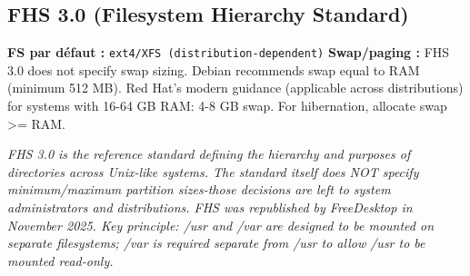 \documentclass[10pt,a4paper]{article}
\begin{document}
\subsection{FHS 3.0 (Filesystem Hierarchy Standard)}
\noindent\small \textbf{FS par d\'efaut :} \texttt{ext4/XFS (distribution-dependent)} \quad\textbullet\quad \textbf{Swap/paging :} FHS 3.0 does not specify swap sizing. Debian recommends swap equal to RAM (minimum 512 MB). Red Hat's modern guidance (applicable across distributions) for systems with 16-64 GB RAM: 4-8 GB swap. For hibernation, allocate swap >= RAM.\normalsize\par\smallskip
\noindent\small\textit{FHS 3.0 is the reference standard defining the hierarchy and purposes of directories across Unix-like systems. The standard itself does NOT specify minimum/maximum partition sizes-those decisions are left to system administrators and distributions. FHS was republished by FreeDesktop in November 2025. Key principle: /usr and /var are designed to be mounted on separate filesystems; /var is required separate from /usr to allow /usr to be mounted read-only.}\normalsize\par\smallskip
\end{document}
